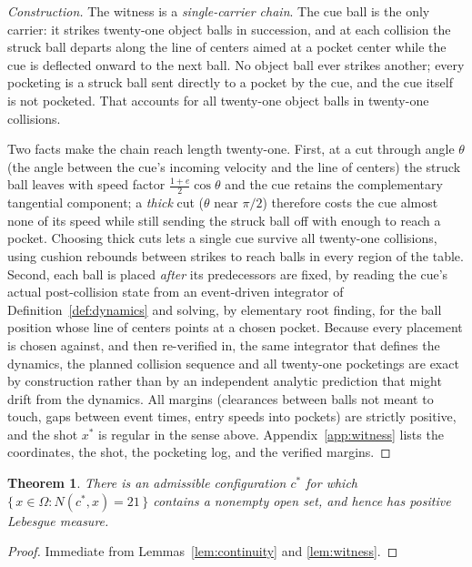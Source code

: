 \documentclass[11pt]{article}
\newtheorem{theorem}{Theorem}
\theoremstyle{definition}
\theoremstyle{remark}
\newcommand{\OO}{\Omega}
\begin{document}
\begin{proof}[Construction]
The witness is a \emph{single-carrier chain}. The cue ball is the
only carrier: it strikes twenty-one object balls in succession, and
at each collision the struck ball departs along the line of centers
aimed at a pocket center while the cue is deflected onward to the next
ball. No object ball ever strikes another; every pocketing is a
struck ball sent directly to a pocket by the cue, and the cue itself
is not pocketed. That accounts for all twenty-one object balls in
twenty-one collisions.

Two facts make the chain reach length twenty-one. First, at a cut
through angle $\theta$ (the angle between the cue's incoming velocity
and the line of centers) the struck ball leaves with speed factor
$\tfrac{1+e}{2}\cos\theta$ and the cue retains the complementary
tangential component; a \emph{thick} cut ($\theta$ near $\pi/2$)
therefore costs the cue almost none of its speed while still sending
the struck ball off with enough to reach a pocket. Choosing thick
cuts lets a single cue survive all twenty-one collisions, using
cushion rebounds between strikes to reach balls in every region of
the table. Second, each ball is placed \emph{after} its predecessors
are fixed, by reading the cue's actual post-collision state from an
event-driven integrator of Definition~\ref{def:dynamics} and solving,
by elementary root finding, for the ball position whose line of
centers points at a chosen pocket. Because every placement is chosen
against, and then re-verified in, the same integrator that defines
the dynamics, the planned collision sequence and all twenty-one
pocketings are exact by construction rather than by an independent
analytic prediction that might drift from the dynamics. All margins
(clearances between balls not meant to touch, gaps between event
times, entry speeds into pockets) are strictly positive, and the shot
$x^{*}$ is regular in the sense above. Appendix~\ref{app:witness}
lists the coordinates, the shot, the pocketing log, and the verified
margins.
\end{proof}

\begin{theorem}
\label{thm:main}
There is an admissible configuration $c^{*}$ for which
$\{\, x \in \OO : N(c^{*}, x) = 21 \,\}$ contains a nonempty open
set, and hence has positive Lebesgue measure.
\end{theorem}

\begin{proof}
Immediate from Lemmas~\ref{lem:continuity} and \ref{lem:witness}.
\end{proof}
\end{document}
